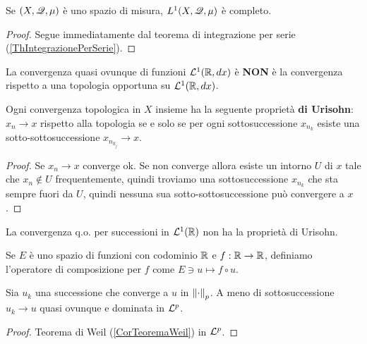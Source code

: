 \begin{proposition}[$L^1$ \`e completo]\label{PrL1Completo}
Se $(X,\mathscr{Q},\mu)$ \`e uno spazio di misura, $L^1(X,\mathscr{Q},\mu)$ \`e completo.
\end{proposition}
\begin{proof}
Segue immediatamente dal teorema di integrazione per serie (\ref{ThIntegrazionePerSerie}).
\end{proof}

\begin{remark}
La convergenza quasi ovunque di funzioni $\mathcal{L}^1(\mathbb{R},dx)$ \`e \textbf{NON} \`e la convergenza rispetto a una topologia opportuna su $\mathcal{L}^1(\mathbb{R},dx)$.

Ogni convergenza topologica in $X$ insieme ha la seguente propriet\`a \textbf{di Urisohn}: $x_n\to x$ rispetto alla topologia se e solo se per ogni sottosuccessione $x_{n_k}$ esiste una sotto-sottosuccessione $x_{n_{k_j}}\to x$.
\begin{proof}
Se $x_n\to x$ converge ok. Se non converge allora esiste un intorno $U$ di $x$ tale che $x_n\notin U$ frequentemente, quindi troviamo una sottosuccessione $x_{n_k}$ che sta sempre fuori da $U$, quindi nessuna sua sotto-sottosuccessione pu\`o convergere a $x$.
\end{proof} 

La convergenza q.o. per successioni in $\mathcal{L}^1(\mathbb{R})$ non ha la propriet\`a di Urisohn.
\end{remark}

\begin{definition}
Se $E$ \`e uno spazio di funzioni con codominio $\mathbb{R}$ e $f:\mathbb{R}\to\mathbb{R}$, definiamo l'operatore di composizione per $f$ come $E\ni u\mapsto f\circ u$.
\end{definition}

\begin{lemma}
Sia $u_k$ una successione che converge a $u$ in $\left\Vert{\cdot}\right\Vert_p$. A meno di sottosuccessione $u_k\to u$ quasi ovunque e dominata in $\mathcal{L}^p$.
\end{lemma}
\begin{proof}
Teorema di Weil (\ref{CorTeoremaWeil}) in $\mathcal{L}^p$.
\end{proof}

